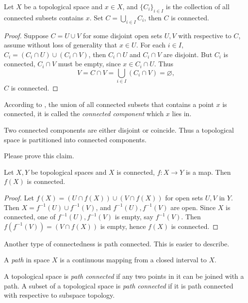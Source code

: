 \begin{lem}\label{lem:connected component}
    Let $X$ be a topological space and $x\in X$, and $\{C_i\}_{i\in I}$ is the collection of all connected subsets contains $x$.
    Set $C=\bigcup_{i\in I}C_i$, then $C$ is connected.
\end{lem}
\begin{proof}
    Suppose $C=U\cup V$ for some disjoint open sets $U,V$ with respective to $C$, assume without loss of generality that $x\in U$.
    For each $i\in I$, $C_i=(C_i\cap U)\cup(C_i\cap V)$, then $C_i\cap U$ and $C_i\cap V$ are disjoint.
    But $C_i$ is connected, $C_i\cap V$ must be empty, since $x\in C_i\cap U$.
    Thus
    \[V=C\cap V=\bigcup_{i\in I}(C_i\cap V)=\varnothing,\]
    $C$ is connected.
\end{proof}

\begin{defn}
    According to , the union of all connected subsets that contains a point $x$ is connected, it is called the \emph{connected component} which $x$ lies in.
\end{defn}

\begin{prop}
    Two connected components are either disjoint or coincide.
    Thus a topological space is partitioned into connected components.
\end{prop}

Please prove this claim.

\begin{prop}\label{prop:connected image}
    Let $X,Y$ be topological spaces and $X$ is connected, $f:X\to Y$ is a map.
    Then $f(X)$ is connected.
\end{prop}
\begin{proof}
    Let $f(X)=(U\cap f(X))\cup(V\cap f(X))$ for open sets $U,V$ in $Y$.
    Then $X=f^{-1}(U)\cup f^{-1}(V)$, and $f^{-1}(U),f^{-1}(V)$ are open.
    Since $X$ is connected, one of $f^{-1}(U),f^{-1}(V)$ is empty, say $f^{-1}(V)$.
    Then $f(f^{-1}(V))=(V\cap f(X))$ is empty, hence $f(X)$ is connected.
\end{proof}

Another type of connectedness is path connected.
This is easier to describe.

\begin{defn}
    A \emph{path} in space $X$ is a continuous mapping from a closed interval to $X$.
\end{defn}

\begin{defn}
    A topological space is \emph{path connected} if any two points in it can be joined with a path.
    A subset of a topological space is \emph{path connected} if it is path connected with respective to subspace topology.
\end{defn}

